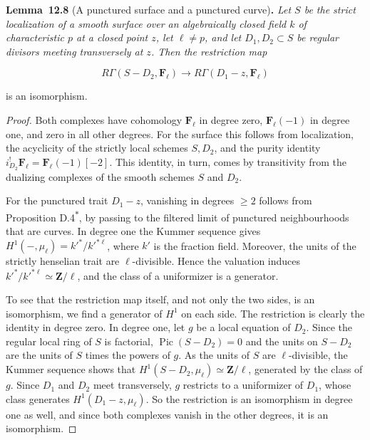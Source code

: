 \documentclass[11pt]{article}
\newenvironment{bpstatement}[2]{\par\addvspace{0.6\baselineskip}\noindent\textbf{#1}#2\textbf{.}\enspace\ignorespaces}
  {\par\addvspace{0.4\baselineskip}}
\newenvironment{bpstatementit}[2]{\begin{bpstatement}{#1}{#2}\itshape\ignorespaces}{\end{bpstatement}}
\newcommand{\bpout}[1]{#1\textsuperscript{\hyperlink{bp-outside}{\ensuremath{\ast}}}}
\begin{document}
\label{bp251}%
\begin{bpstatementit}{Lemma~12.8}{ (A punctured surface and a punctured curve)}
Let \(S\) be the strict localization of a smooth surface over an algebraically closed field \(k\) of characteristic \(p\) at a closed point \(z\), let \(\ell\neq p\), and let \(D_1,D_2\subset S\) be regular divisors meeting transversely at \(z\). Then the restriction map

\[
R\Gamma(S-D_2,\mathbf F_\ell)\longrightarrow R\Gamma(D_1-z,\mathbf F_\ell)
\]

is an isomorphism.
\end{bpstatementit}

\begin{proof}[{Proof}]\label{bp252}%
Both complexes have cohomology \(\mathbf F_\ell\) in degree zero, \(\mathbf F_\ell(-1)\) in degree one, and zero in all other degrees. For the surface this follows from localization, the acyclicity of the strictly local schemes \(S,D_2\), and the purity identity \(i_{D_2}^!\mathbf F_\ell=\mathbf F_\ell(-1)[-2]\). This identity, in turn, comes by transitivity from the dualizing complexes of the smooth schemes \(S\) and \(D_2\).

For the punctured trait \(D_1-z\), vanishing in degrees \(\geq2\) follows from Proposition \bpout{D.4}, by passing to the filtered limit of punctured neighbourhoods that are curves. In degree one the Kummer sequence gives \(H^1(-,\mu_\ell)=k'^*/k'^{*\ell}\), where \(k'\) is the fraction field. Moreover, the units of the strictly henselian trait are \(\ell\)-divisible. Hence the valuation induces \(k'^*/k'^{*\ell}\simeq\mathbf Z/\ell\), and the class of a uniformizer is a generator.

To see that the restriction map itself, and not only the two sides, is an isomorphism, we find a generator of \(H^1\) on each side. The restriction is clearly the identity in degree zero. In degree one, let \(g\) be a local equation of \(D_2\). Since the regular local ring of \(S\) is factorial, \(\operatorname{Pic}(S-D_2)=0\) and the units on \(S-D_2\) are the units of \(S\) times the powers of \(g\). As the units of \(S\) are \(\ell\)-divisible, the Kummer sequence shows that \(H^1(S-D_2,\mu_\ell)\simeq\mathbf Z/\ell\), generated by the class of \(g\). Since \(D_1\) and \(D_2\) meet transversely, \(g\) restricts to a uniformizer of \(D_1\), whose class generates \(H^1(D_1-z,\mu_\ell)\). So the restriction is an isomorphism in degree one as well, and since both complexes vanish in the other degrees, it is an isomorphism.
\end{proof}
\end{document}
